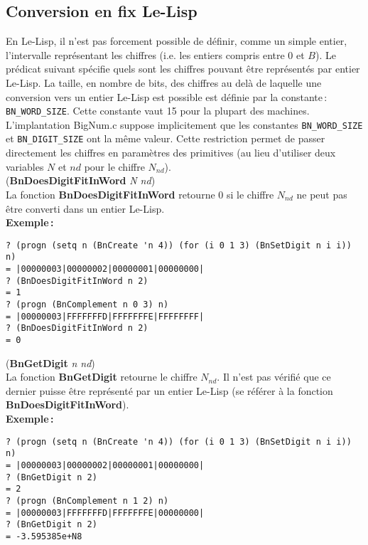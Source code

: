\subsection{Conversion en fix Le-Lisp}
En Le-Lisp, il n'est pas forcement possible de d\'efinir, comme un simple
entier, l'intervalle repr\'esentant les chiffres (i.e. les entiers compris
entre 0 et $B$). Le pr\'edicat suivant sp\'ecifie quels sont les chiffres
pouvant \^etre repr\'esent\'es par entier Le-Lisp. La taille, en nombre de bits,
des chiffres au del\`a de laquelle une conversion vers un entier Le-Lisp est
possible est d\'efinie par la constante\,: \verb+BN_WORD_SIZE+. Cette
constante vaut 15 pour la plupart des machines. L'implantation BigNum.c
suppose implicitement que les constantes \verb+BN_WORD_SIZE+ et
\verb+BN_DIGIT_SIZE+ ont la m\^eme valeur. Cette restriction permet de passer
directement les chiffres en param\`etres des primitives (au lieu d'utiliser
deux variables $N$ et $nd$ pour le chiffre $N_{nd}$).
\\[24pt]
({\bf BnDoesDigitFitInWord} {\em N nd})
\\[12pt]
La fonction {\bf BnDoesDigitFitInWord} retourne 0 si le chiffre $N_{nd}$
ne peut pas \^etre converti dans un entier Le-Lisp.
\\[18pt]
{\bf Exemple\,:}
\begin{verbatim}
? (progn (setq n (BnCreate 'n 4)) (for (i 0 1 3) (BnSetDigit n i i)) n)
= |00000003|00000002|00000001|00000000|
? (BnDoesDigitFitInWord n 2)
= 1
? (progn (BnComplement n 0 3) n)
= |00000003|FFFFFFFD|FFFFFFFE|FFFFFFFF|
? (BnDoesDigitFitInWord n 2)
= 0
\end{verbatim}
\vspace*{24pt}
({\bf BnGetDigit} {\em n nd})
\\[12pt]
La fonction {\bf BnGetDigit} retourne le chiffre $N_{nd}$. Il n'est pas
v\'erifi\'e que ce dernier puisse \^etre repr\'esent\'e par un entier Le-Lisp (se
r\'ef\'erer \`a la fonction {\bf BnDoesDigitFitInWord}).
\\[18pt]
{\bf Exemple\,:}
\begin{verbatim}
? (progn (setq n (BnCreate 'n 4)) (for (i 0 1 3) (BnSetDigit n i i)) n)
= |00000003|00000002|00000001|00000000|
? (BnGetDigit n 2)
= 2
? (progn (BnComplement n 1 2) n)
= |00000003|FFFFFFFD|FFFFFFFE|00000000|
? (BnGetDigit n 2)
= -3.595385e+N8
\end{verbatim}
\vspace*{15pt}


